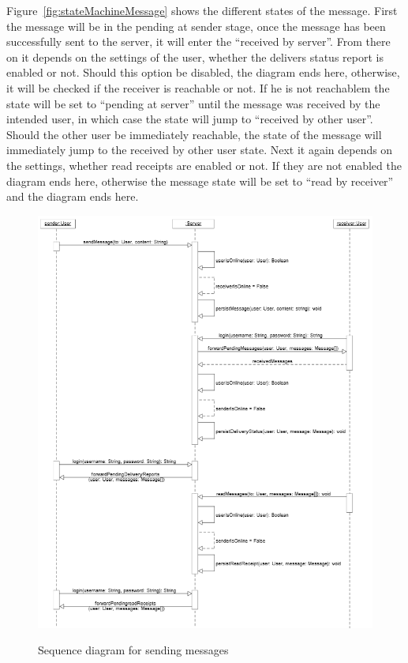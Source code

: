 Figure~\ref{fig:stateMachineMessage} shows the different states of the message. First the message will be in the pending at sender stage, once the message has been successfully sent to the server, it will enter the “received by server”. From there on it depends on the settings of the user, whether the delivers status report is enabled or not. Should this option be disabled, the diagram ends here, otherwise, it will be checked if the receiver is reachable or not. If he is not reachablem the state will be set to “pending at server” until the message was received by the intended user, in which case the state will jump to “received by other user”. Should the other user be immediately reachable, the state of the message will immediately jump to the received by other user state. Next it again depends on the settings, whether read receipts are enabled or not. If they are not enabled the diagram ends here, otherwise the message state will be set to “read by receiver” and the diagram ends here.

\begin{figure}[h]
	\centering
	\caption{Sequence diagram for sending messages}
	\includegraphics[width=1.0\textwidth]{./images/sequenceDiagramMessage.png}
	\label{fig:sequenceDiagramMessage}
\end{figure}

